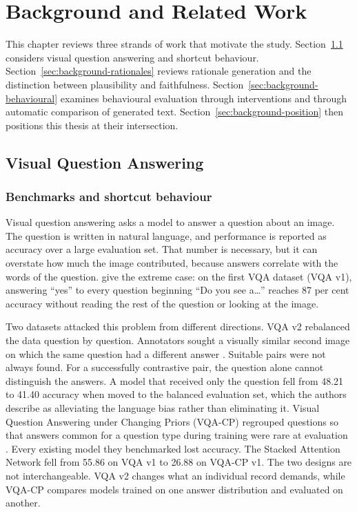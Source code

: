 
\chapter{Background and Related Work}
\label{ch:related-work}

This chapter reviews three strands of work that motivate the study.
Section~\ref{sec:background-vqa} considers visual question answering and shortcut
behaviour. Section~\ref{sec:background-rationales} reviews rationale generation and
the distinction between plausibility and faithfulness.
Section~\ref{sec:background-behavioural} examines behavioural evaluation through
interventions and through automatic comparison of generated text.
Section~\ref{sec:background-position} then positions this thesis at their
intersection.

\section{Visual Question Answering}
\label{sec:background-vqa}

\subsection{Benchmarks and shortcut behaviour}
\label{sec:background-shortcuts}

Visual question answering asks a model to answer a question about an image. The
question is written in natural language, and performance is reported as accuracy
over a large evaluation set. That number is necessary, but it can overstate how
much the image contributed, because answers correlate with the words of the
question. \citet{DBLP:conf/cvpr/GoyalKSBP17} give the extreme case: on the first
VQA dataset (VQA v1), answering \enquote{yes} to every question beginning
\enquote{Do you see a\ldots} reaches 87 per cent accuracy without reading the
rest of the question or looking at the image.

Two datasets attacked this problem from different directions. VQA v2 rebalanced
the data question by question. Annotators sought a visually similar second image
on which the same question had a different answer
\citep{DBLP:conf/cvpr/GoyalKSBP17}. Suitable pairs were not always found. For a
successfully contrastive pair, the question alone cannot distinguish the answers.
A model that received only the question fell
from 48.21 to 41.40 accuracy when moved to the balanced evaluation set, which the
authors describe as alleviating the language bias rather than eliminating it.
Visual Question Answering under Changing Priors (VQA-CP) regrouped questions so
that answers common for a question type during training were rare at evaluation
\citep{DBLP:conf/cvpr/AgrawalBPK18}. Every existing model they benchmarked lost
accuracy. The Stacked Attention Network fell from 55.86 on VQA v1 to 26.88 on
VQA-CP v1. The two designs are not
interchangeable. VQA v2 changes what an individual record demands, while VQA-CP
compares models trained on one answer distribution and evaluated on another.


